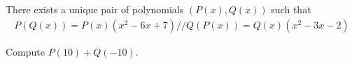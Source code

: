 There exists a unique pair of polynomials $(P(x), Q(x))$ such that
\begin{align}
P(Q(x))=P(x)\left(x^{2}-6 x+7\right) //
Q(P(x))=Q(x)\left(x^{2}-3 x-2\right)
\end{align}

Compute $P(10)+Q(-10)$.